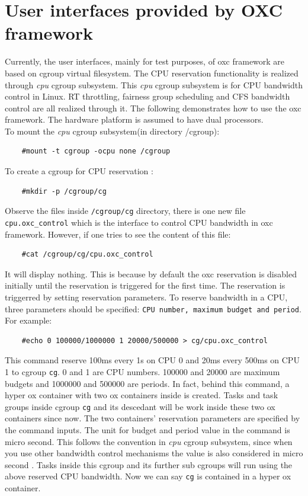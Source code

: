 \section{User interfaces provided by OXC framework}
Currently, the user interfaces, mainly for test purposes, 
of oxc framework are based on cgroup virtual
filesystem. The CPU reservation functionality is realized through 
\emph{cpu} cgroup subsystem. This \emph{cpu} cgroup subsystem is for CPU 
bandwidth control in Linux. RT throttling, fairness group scheduling and 
CFS bandwidth control are all realized through it. The following demonstrates 
how to use the oxc framework. The hardware platform is assumed to have dual
processors.\\
To mount the \emph{cpu} cgroup subsystem(in directory /cgroup):
\begin{lstlisting}
	#mount -t cgroup -ocpu none /cgroup
\end{lstlisting} 
To create a cgroup for CPU reservation :
\begin{lstlisting}
	#mkdir -p /cgroup/cg
\end{lstlisting}
Observe the files inside \texttt{/cgroup/cg} directory, there is one
new file \texttt{cpu.oxc\_control} which is the interface to control
CPU bandwidth in oxc framework. However, if one tries to see the content
of this file:
\begin{lstlisting}
	#cat /cgroup/cg/cpu.oxc_control
\end{lstlisting}
It will display nothing. This is because by default the oxc reservation
is disabled initially until the reservation is triggered for the first 
time. The reservation is triggerred by setting reservation parameters.
To reserve bandwidth in a CPU, three parameters should be specified:
\texttt{CPU number, maximum budget and period}. For example:
\begin{lstlisting}
	#echo 0 100000/1000000 1 20000/500000 > cg/cpu.oxc_control
\end{lstlisting}
This command reserve 100ms every 1s on CPU 0 and 20ms every 500ms on CPU 1
to cgroup \texttt{cg}. 0 and 1 are CPU numbers. 100000 and 20000 are maximum
budgets and 1000000 and 500000 are periods. 
In fact, behind this command, a hyper ox container with two ox containers
inside is created. 
Tasks and task groups inside cgroup \texttt{cg} and its
descedant will be work inside these two ox containers since now.
The two containers' reservation parameters are specified
by the command inputs. 
The unit for budget and period value in the command 
is micro second. This follows the convention in \emph{cpu} cgroup
subsystem, since when you use other bandwidth control mechanisms the value 
is also considered in micro second . Tasks inside this cgroup and its further 
sub cgroups will run using the above reserved CPU bandwidth. Now we can say 
\texttt{cg} is contained in a hyper ox container.

